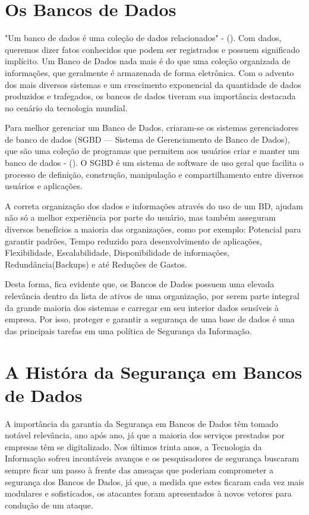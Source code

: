 \vspace{1.0cm}
\begingroup
\let\clearpage\relax
\chapter{Os Bancos de Dados}
\endgroup

"Um banco de dados é uma coleção de dados relacionados" - (\textcite{navathe}). Com dados, queremos dizer fatos conhecidos que podem ser registrados e possuem significado implícito.  Um Banco de Dados nada mais é do que uma coleção organizada de informações, que geralmente é armazenada de forma eletrônica. Com o advento dos mais diversos sistemas e um crescimento exponencial da quantidade de dados produzidos e trafegados, os bancos de dados tiveram sua importância destacada no cenário da tecnologia mundial.

Para melhor gerenciar um Banco de Dados, criaram-se os sistemas gerenciadores de banco de dados (SGBD — Sistema de Gerenciamento de Banco de Dados), que são uma coleção de programas que permitem aos usuários criar e manter um banco de dados - (\textcite{navathe}). O SGBD é um sistema de software de uso geral que facilita o processo de definição, construção, manipulação e compartilhamento entre diversos usuários e aplicações.

A correta organização dos dados e informações através do uso de um BD, ajudam não só a melhor experiência por parte do usuário, mas também asseguram diversos benefícios a maioria das organizações, como por exemplo: Potencial para garantir padrões, Tempo reduzido para desenvolvimento de aplicações, Flexibilidade, Escalabilidade, Disponibilidade de informações, Redundância(Backups) e até Reduções de Gastos.

Desta forma, fica evidente que, os Bancos de Dados possuem uma elevada relevância dentro da lista de ativos de uma organização, por serem parte integral da grande maioria dos sistemas e carregar em seu interior dados sensíveis à empresa. Por isso, proteger e garantir a segurança de uma base de dados é uma das principais tarefas em uma política de Segurança da Informação.

\vspace{1.0cm}
\begingroup
\let\clearpage\relax
\chapter{A Históra da Segurança em Bancos de Dados}
\endgroup

A importância da garantia da Segurança em Bancos de Dados têm tomado notável relevância, ano após ano, já que a maioria dos serviços prestados por empresas têm se digitalizado. Nos últimos trinta anos, a Tecnologia da Informação sofreu incontáveis avanços e os pesquisadores de segurança buscaram sempre ficar um passo à frente das ameaças que poderiam comprometer a segurança dos Bancos de Dados, já que, a medida que estes ficaram cada vez mais modulares e sofisticados, os atacantes foram apresentados à novos vetores para condução de um ataque.

